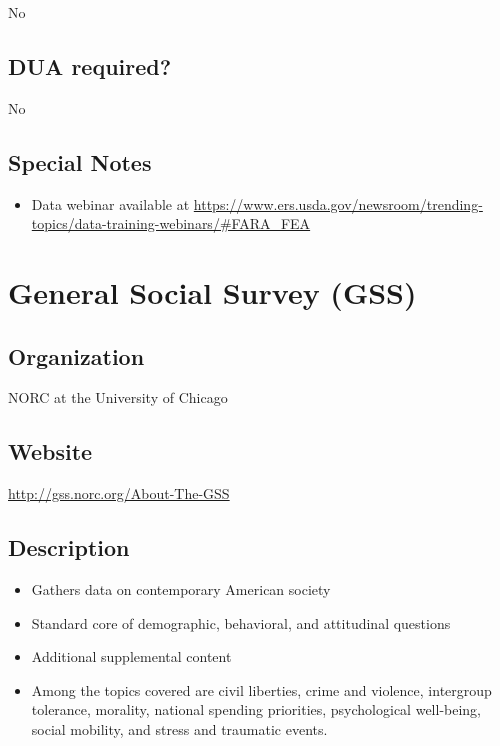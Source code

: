 \documentclass[
]{book}
\providecommand{\tightlist}{%
  \setlength{\itemsep}{0pt}\setlength{\parskip}{0pt}}
\begin{document}
No

\hypertarget{dua-required-26}{%
\section{DUA required?}\label{dua-required-26}}

No

\hypertarget{special-notes-26}{%
\section{Special Notes}\label{special-notes-26}}

\begin{itemize}
\tightlist
\item
  Data webinar available at \url{https://www.ers.usda.gov/newsroom/trending-topics/data-training-webinars/\#FARA_FEA}
\end{itemize}

\mainmatter

\hypertarget{general-social-survey-gss}{%
\chapter{General Social Survey (GSS)}\label{general-social-survey-gss}}

\hypertarget{organization-27}{%
\section{Organization}\label{organization-27}}

NORC at the University of Chicago

\hypertarget{website-27}{%
\section{Website}\label{website-27}}

\url{http://gss.norc.org/About-The-GSS}

\hypertarget{description-27}{%
\section{Description}\label{description-27}}

\begin{itemize}
\tightlist
\item
  Gathers data on contemporary American society
\item
  Standard core of demographic, behavioral, and attitudinal questions
\item
  Additional supplemental content
\item
  Among the topics covered are civil liberties, crime and violence, intergroup tolerance, morality, national spending priorities, psychological well-being, social mobility, and stress and traumatic events.
\end{itemize}
\end{document}
